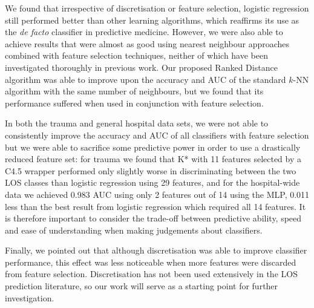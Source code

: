 We found that irrespective of discretisation or feature selection, logistic
regression still performed better than other learning algorithms, which
reaffirms its use as the \textit{de facto} classifier in predictive medicine.
However, we were also able to achieve results that were almost as good using
nearest neighbour approaches combined with feature selection techniques,
neither of which have been investigated thoroughly in previous work. Our
proposed Ranked Distance algorithm was able to improve upon the accuracy and AUC of
the standard $k$-NN algorithm with the same number of neighbours, but we found
that its performance suffered when used in conjunction with feature selection.

In both the trauma and general hospital data sets, we were not able to
consistently improve the accuracy and AUC of all
classifiers with feature selection but we were able to sacrifice some
predictive power in order to use a drastically reduced feature set: for trauma
we found that K* with 11 features selected by a C4.5 wrapper performed only
slightly worse in discriminating between the two LOS classes than logistic
regression using 29 features, and for the hospital-wide data we achieved
0.983 AUC using only 2 features out of 14 using the MLP, 0.011 less than the
best result from logistic regression which required all 14 features. It is
therefore important to consider the trade-off between predictive ability,
speed and ease of understanding when making judgements about classifiers.

Finally, we pointed out that although discretisation was able to improve
classifier performance, this effect was less noticeable when more features
were discarded from feature selection. Discretisation has not been used
extensively in the LOS prediction literature, so our work will serve as a
starting point for further investigation.
